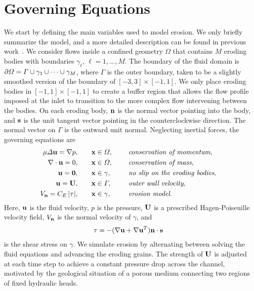 \documentclass{jfm}
\begin{document}
\section{Governing Equations}
\label{sec:formulation}
We start by defining the main variables used to model erosion.  We only
briefly summarize the model, and a more detailed description can be
found in previous work~\citep{qua-moo2018}.  We consider flows inside a
confined geometry $\Omega$ that contains $M$ eroding bodies with
boundaries $\gamma_\ell$, $\ell = 1,\ldots,M$.  The boundary of the
fluid domain is $\bd \Omega = \Gamma \cup \gamma_1 \cup \cdots \cup
\gamma_M$, where $\Gamma$ is the outer boundary, taken to be a slightly
smoothed version of the boundary of $[-3,3] \times [-1,1]$.  We only
place eroding bodies in $[-1,1] \times [-1,1]$ to create a buffer region
that allows the flow profile imposed at the inlet to transition to the more
complex flow intervening between the bodies. On each eroding body, $\nn$
is the normal vector pointing into the body, and $\ss$ is the unit
tangent vector pointing in the counterclockwise direction.  The normal
vector on $\Gamma$ is the outward unit normal.  Neglecting inertial
forces, the governing equations are
\begin{equation}
\label{eqn:erosionModel}
  \begin{split}
    \mu \Delta \uu = \grad p, &\hspace{20pt} \xx \in \Omega, \gap 
      &&\mbox{\em conservation of momentum}, \\
    \grad \cdot \uu = 0, &\hspace{20pt} \xx \in \Omega, \gap 
      &&\mbox{\em conservation of mass}, \\
    \uu = \mathbf{0}, &\hspace{20pt} \xx \in \gamma, \gap 
      &&\mbox{\em no slip on the eroding bodies}, \\
    \uu = \UU, &\hspace{20pt} \xx \in \Gamma, \gap 
      &&\mbox{\em outer wall velocity}, \\
    \Vn = \CE \, \abs{\tau}, &\hspace{20pt} \xx \in \gamma,
      &&\mbox{\em erosion model}.
  \end{split}
\end{equation}
Here, $\uu$ is the fluid velocity, $p$ is the pressure, $\UU$ is a
prescribed Hagen-Poiseuille velocity field, $\Vn$ is the normal velocity
of $\gamma$, and
\begin{align}
  \tau = -(\nabla \uu + \nabla \uu^T) \nn \cdot \ss
  \label{eqn:shearStress}
\end{align}
is the shear stress on $\gamma$. We simulate erosion by alternating
between solving the fluid equations and advancing the eroding grains.
The strength of $\UU$ is adjusted at each time step to achieve a
constant pressure drop across the channel, motivated by the geological
situation of a porous medium connecting two regions of  fixed hydraulic
heads.
\end{document}
